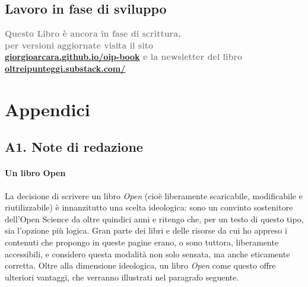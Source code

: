 \documentclass[
  italian,
  letterpaper,
  paper=A4,
  headinclude=on,
  footinclude=on,
  12pt]{scrbook}
\begin{document}

\printbibliography[heading=none]


\chapter*{Lavoro in fase di sviluppo}\label{lavoro-in-fase-di-sviluppo}


\begin{center}{\Large \textcolor{gray}{\textbf{Questo Libro è ancora in fase di scrittura,\\ per versioni aggiornate visita il sito\\ \url{giorgioarcara.github.io/oip-book} e la newsletter del libro \url{oltreipunteggi.substack.com/}}}} \end{center}

\part{Appendici}

\chapter*{A1. Note di redazione}\label{note_redazione}


\subsection*{Un libro Open}\label{un-libro-open}

La decisione di scrivere un libro \emph{Open} (cioè liberamente
scaricabile, modificabile e riutilizzabile) è innanzitutto una scelta
ideologica: sono un convinto sostenitore dell'Open Science da oltre
quindici anni e ritengo che, per un testo di questo tipo, sia l'opzione
più logica. Gran parte dei libri e delle risorse da cui ho appreso i
contenuti che propongo in queste pagine erano, o sono tuttora,
liberamente accessibili, e considero questa modalità non solo sensata,
ma anche eticamente corretta. Oltre alla dimensione ideologica, un libro
\emph{Open} come questo offre ulteriori vantaggi, che verranno
illustrati nel paragrafo seguente.
\end{document}

